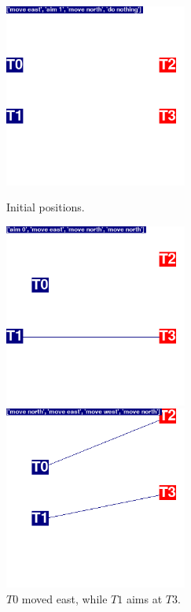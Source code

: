 \begin{figure}[htp]
\centering
\begin{minipage}{.45\textwidth}
  \centering
  \includegraphics[width=6cm]{images/animation03/screenshot01.png}
  \caption*{Initial positions.}
\end{minipage}%
\begin{minipage}{.1\textwidth}
\centering
  \caption*{ }
\end{minipage}%
\begin{minipage}{.45\textwidth}
  \centering
  \includegraphics[width=6cm]{images/animation03/screenshot02.png}
  \caption*{ $T0$ moved east, while $T1$ aims at $T3$.}
\end{minipage}
\centering
\begin{minipage}{.45\textwidth}
  \centering
  \includegraphics[width=6cm]{images/animation03/screenshot03.png}

\end{minipage}
\end{figure}
